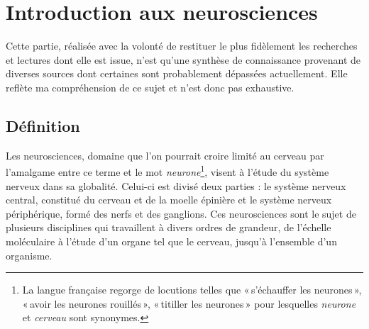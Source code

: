 \documentclass[12pt,fleqn,oneside,french,openany]{book} %
\begin{document}
\section{Introduction aux neurosciences} \label{sec:introNeuro}
\begin{remark}
	Cette partie, réalisée avec la volonté de restituer le plus fidèlement les recherches et lectures dont elle est issue, n'est qu'une synthèse de connaissance provenant de diverses sources dont certaines sont probablement dépassées actuellement. Elle reflète ma compréhension de ce sujet et n'est donc pas exhaustive.
\end{remark}

\subsection[Définition]{Définition \cite{wikineuro}} \label{ssec:definition} %
Les neurosciences, domaine que l'on pourrait croire limité au cerveau par l'amalgame entre ce terme et le mot \emph{neurone}\footnote{La langue française regorge de locutions telles que «\,s'échauffer les neurones\,», «\,avoir les neurones rouillés\,», «\,titiller les neurones\,» pour lesquelles \emph{neurone} et \emph{cerveau} sont synonymes.}, visent à l'étude du système nerveux dans sa globalité. Celui-ci est divisé deux parties : le système nerveux central, constitué du cerveau et de la moelle épinière et le système nerveux périphérique, formé des nerfs et des ganglions. Ces neurosciences sont le sujet de plusieurs disciplines qui travaillent à divers ordres de grandeur, de l'échelle moléculaire à l'étude d'un organe tel que le cerveau, jusqu'à l'ensemble d'un organisme.

\begin{figure}[h]
\end{figure}
\end{document}
